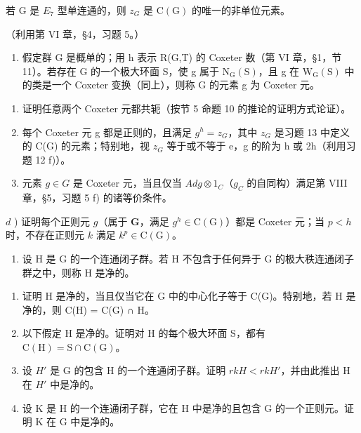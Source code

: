 若 G 是 \(E_{7}\) 型单连通的，则 \(z_{G}\) 是 \(\mathrm{C}(\mathrm{G})\) 的唯一的非单位元素。

（利用第 VI 章，§4，习题 5。）

\begin{enumerate}
\def\labelenumi{\arabic{enumi})}
\setcounter{enumi}{13}
\tightlist
\item
  假定群 G 是概单的；用 h 表示 R(G,T) 的 Coxeter 数（第 VI 章，§1，节 11）。若存在 G 的一个极大环面 S，使 g 属于 \(\mathrm{N}_{\mathrm{G}}(\mathrm{S})\)，且 g 在 \(\mathrm{W}_{\mathrm{G}}(\mathrm{S})\) 中的类是一个 Coxeter 变换（同上），则称 G 的元素 g 为 Coxeter 元。
\end{enumerate}

\begin{enumerate}
\def\labelenumi{\alph{enumi})}
\item
  证明任意两个 Coxeter 元都共轭（按节 5 命题 10 的推论的证明方式论证）。
\item
  每个 Coxeter 元 g 都是正则的，且满足 \(g^{h} = z_{G}\)，其中 \(z_{G}\) 是习题 13 中定义的 C(G) 的元素；特别地，视 \(z_{G}\) 等于或不等于 e，g 的阶为 h 或 2h（利用习题 12 f)）。
\item
  元素 \(g \in G\) 是 Coxeter 元，当且仅当 \(Ad g \otimes 1_{C}\)（\(g_{C}\) 的自同构）满足第 VIII 章，§5，习题 5 f) 的诸等价条件。
\end{enumerate}

\(d\) ) 证明每个正则元 \(g\)（属于 \(\mathbf{G}\)，满足 \(g^{h}\in \mathrm{C}(\mathrm{G})\)）都是 Coxeter 元；当 \(p < h\) 时，不存在正则元 \(k\) 满足 \(k^p\in \mathrm{C}(\mathrm{G})\)。

\begin{enumerate}
\def\labelenumi{\arabic{enumi})}
\setcounter{enumi}{14}
\tightlist
\item
  设 H 是 G 的一个连通闭子群。若 H 不包含于任何异于 G 的极大秩连通闭子群之中，则称 H 是净的。
\end{enumerate}

\begin{enumerate}
\def\labelenumi{\alph{enumi})}
\item
  证明 H 是净的，当且仅当它在 G 中的中心化子等于 C(G)。特别地，若 H 是净的，则 C(H) = C(G) ∩ H。
\item
  以下假定 H 是净的。证明对 H 的每个极大环面 S，都有 \(\mathrm{C}(\mathrm{H}) = \mathrm{S} \cap \mathrm{C}(\mathrm{G})\)。
\item
  设 \(H'\) 是 G 的包含 H 的一个连通闭子群。证明 \(rkH < rkH'\)，并由此推出 H 在 \(H'\) 中是净的。
\item
  设 K 是 H 的一个连通闭子群，它在 H 中是净的且包含 G 的一个正则元。证明 K 在 G 中是净的。
\end{enumerate}

